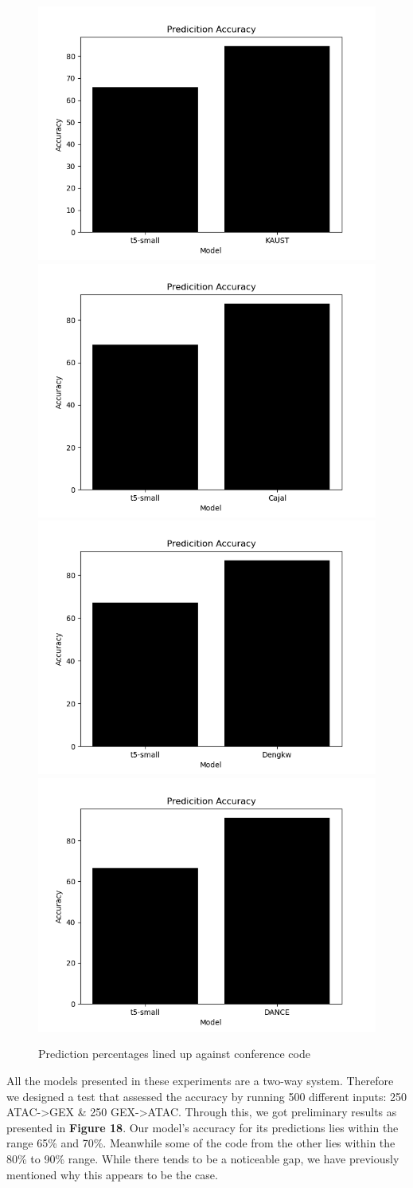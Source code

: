 \begin{figure}[H]
\centering
\includegraphics[width=.4\textwidth]{figures/data1.png}
\includegraphics[width=.4\textwidth]{figures/data2.png}\\
\includegraphics[width=.4\textwidth]{figures/data3.png}
\includegraphics[width=.4\textwidth]{figures/data4.png}
\caption{Prediction percentages lined up against conference code}
\end{figure}


All the models presented in these experiments are a two-way system. Therefore we designed a test that assessed the accuracy by running 500 different inputs: 
250 ATAC->GEX \& 250 GEX->ATAC. Through this, we got preliminary results as presented in \textbf{Figure 18}. Our model's accuracy for its predictions lies within the range 65\% and 70\%. Meanwhile some of the code from the other lies within the 80\% to 90\% range. While there tends to be a noticeable gap, we have previously mentioned why this appears to be the case. 

